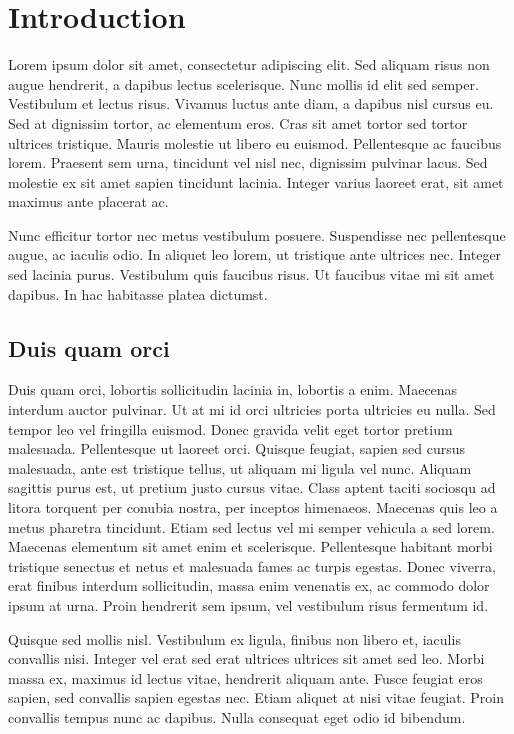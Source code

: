 \documentclass[a4paper,10pt]{report}
\begin{document}
\chapter{Introduction}

Lorem ipsum dolor sit amet, consectetur adipiscing elit. Sed aliquam risus non augue hendrerit, a dapibus lectus
scelerisque. Nunc mollis id elit sed semper. Vestibulum et lectus risus. Vivamus luctus ante diam, a dapibus nisl
cursus eu. Sed at dignissim tortor, ac elementum eros. Cras sit amet tortor sed tortor ultrices tristique.
Mauris molestie ut libero eu euismod. Pellentesque ac faucibus lorem. Praesent sem urna, tincidunt vel nisl nec,
dignissim pulvinar lacus. Sed molestie ex sit amet sapien tincidunt lacinia. Integer varius laoreet erat, sit
amet maximus ante placerat ac.

Nunc efficitur tortor nec metus vestibulum posuere. Suspendisse nec pellentesque augue, ac iaculis odio.
In aliquet leo lorem, ut tristique ante ultrices nec. Integer sed lacinia purus. Vestibulum quis faucibus risus.
Ut faucibus vitae mi sit amet dapibus. In hac habitasse platea dictumst.

\section{Duis quam orci}

Duis quam orci, lobortis sollicitudin lacinia in, lobortis a enim. Maecenas interdum auctor pulvinar.
Ut at mi id orci ultricies porta ultricies eu nulla. Sed tempor leo vel fringilla euismod. Donec gravida velit
eget tortor pretium malesuada. Pellentesque ut laoreet orci. Quisque feugiat, sapien sed cursus malesuada,
ante est tristique tellus, ut aliquam mi ligula vel nunc. Aliquam sagittis purus est, ut pretium justo cursus vitae.
Class aptent taciti sociosqu ad litora torquent per conubia nostra, per inceptos himenaeos.
Maecenas quis leo a metus pharetra tincidunt. Etiam sed lectus vel mi semper vehicula a sed lorem.
Maecenas elementum sit amet enim et scelerisque.
Pellentesque habitant morbi tristique senectus et netus et malesuada fames ac turpis egestas.
Donec viverra, erat finibus interdum sollicitudin, massa enim venenatis ex, ac commodo dolor ipsum at urna.
Proin hendrerit sem ipsum, vel vestibulum risus fermentum id.

Quisque sed mollis nisl. Vestibulum ex ligula, finibus non libero et, iaculis convallis nisi.
Integer vel erat sed erat ultrices ultrices sit amet sed leo. Morbi massa ex, maximus id lectus vitae,
hendrerit aliquam ante. Fusce feugiat eros sapien, sed convallis sapien egestas nec. Etiam aliquet at
nisi vitae feugiat. Proin convallis tempus nunc ac dapibus. Nulla consequat eget odio id bibendum.
\end{document}
